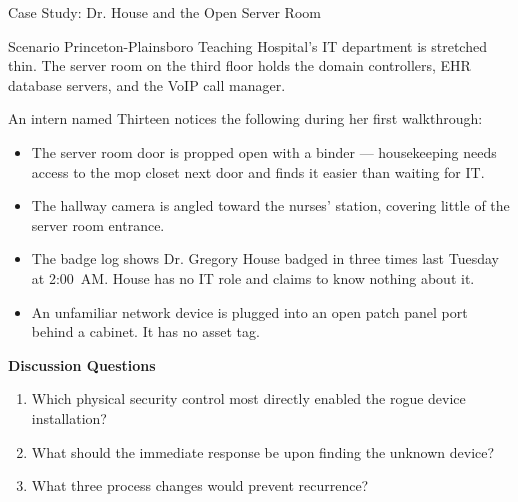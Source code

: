 \documentclass[aspectratio=169]{beamer}  %
\begin{document}
\begin{frame}{Case Study: Dr. House and the Open Server Room}
    \begin{block}{Scenario}
        \scriptsize
        Princeton-Plainsboro Teaching Hospital's IT department is stretched thin. The server room on the third floor holds the domain controllers, EHR database servers, and the VoIP call manager.

        An intern named Thirteen notices the following during her first walkthrough:
        \begin{itemize}\setlength{\itemsep}{1pt}
            \item The server room door is propped open with a binder --- housekeeping needs access to the mop closet next door and finds it easier than waiting for IT.
            \item The hallway camera is angled toward the nurses' station, covering little of the server room entrance.
            \item The badge log shows Dr. Gregory House badged in three times last Tuesday at 2:00~AM. House has no IT role and claims to know nothing about it.
            \item An unfamiliar network device is plugged into an open patch panel port behind a cabinet. It has no asset tag.
        \end{itemize}
    \end{block}
    \scriptsize
    \textbf{Discussion Questions}
    \begin{enumerate}\setlength{\itemsep}{1pt}
        \item Which physical security control most directly enabled the rogue device installation?
        \item What should the immediate response be upon finding the unknown device?
        \item What three process changes would prevent recurrence?
    \end{enumerate}
\end{frame}
\end{document}
